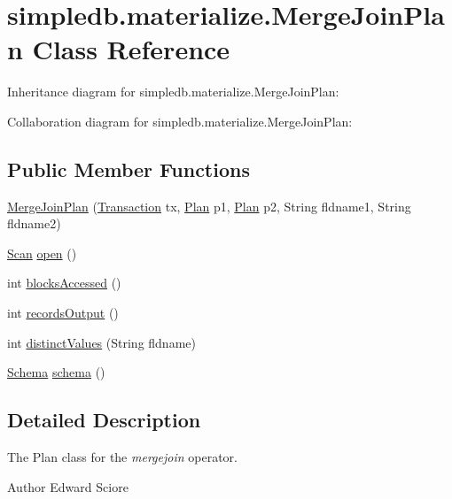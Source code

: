 \hypertarget{classsimpledb_1_1materialize_1_1MergeJoinPlan}{}\section{simpledb.\+materialize.\+Merge\+Join\+Plan Class Reference}
\label{classsimpledb_1_1materialize_1_1MergeJoinPlan}


Inheritance diagram for simpledb.\+materialize.\+Merge\+Join\+Plan\+:


Collaboration diagram for simpledb.\+materialize.\+Merge\+Join\+Plan\+:
\subsection*{Public Member Functions}
\begin{DoxyCompactItemize}
\item 
\hyperlink{classsimpledb_1_1materialize_1_1MergeJoinPlan_a3d7ecb74f147722e0df66749e63c6006}{Merge\+Join\+Plan} (\hyperlink{classsimpledb_1_1tx_1_1Transaction}{Transaction} tx, \hyperlink{interfacesimpledb_1_1plan_1_1Plan}{Plan} p1, \hyperlink{interfacesimpledb_1_1plan_1_1Plan}{Plan} p2, String fldname1, String fldname2)
\item 
\hyperlink{interfacesimpledb_1_1query_1_1Scan}{Scan} \hyperlink{classsimpledb_1_1materialize_1_1MergeJoinPlan_aa37bca23bb46556e265de8ed03c0e2e9}{open} ()
\item 
int \hyperlink{classsimpledb_1_1materialize_1_1MergeJoinPlan_a4ceef561ece4dad75dd41e46ff5d184c}{blocks\+Accessed} ()
\item 
int \hyperlink{classsimpledb_1_1materialize_1_1MergeJoinPlan_a4491095a660740e251d50bd33628dc2d}{records\+Output} ()
\item 
int \hyperlink{classsimpledb_1_1materialize_1_1MergeJoinPlan_a70b3e49e98fb23b0f99051e5f3e8af60}{distinct\+Values} (String fldname)
\item 
\hyperlink{classsimpledb_1_1record_1_1Schema}{Schema} \hyperlink{classsimpledb_1_1materialize_1_1MergeJoinPlan_a3e1d4a728b4454d33adc811aa24989f4}{schema} ()
\end{DoxyCompactItemize}


\subsection{Detailed Description}
The Plan class for the {\itshape mergejoin} operator. \begin{DoxyAuthor}{Author}
Edward Sciore 
\end{DoxyAuthor}


